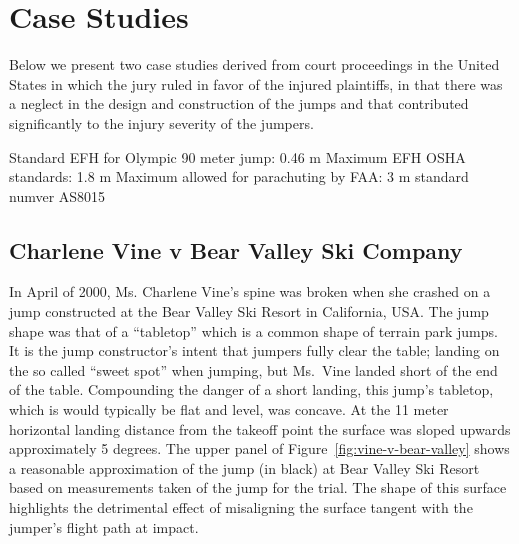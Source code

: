 \documentclass{article}
\begin{document}
\section{Case Studies}
%
Below we present two case studies derived from court proceedings in the United
States in which the jury ruled in favor of the injured plaintiffs, in that
there was a neglect in the design and construction of the jumps and that
contributed significantly to the injury severity of the jumpers.

Standard EFH for Olympic 90 meter jump: 0.46 m
Maximum EFH OSHA standards: 1.8 m
Maximum allowed for parachuting by FAA: 3 m standard numver AS8015


\subsection{Charlene Vine v Bear Valley Ski Company}
%
In April of 2000, Ms. Charlene Vine's spine was broken when she crashed on a
jump constructed at the Bear Valley Ski Resort in California, USA. The jump
shape was that of a ``tabletop'' which is a common shape of terrain park jumps.
It is the jump constructor's intent that jumpers fully clear the table; landing
on the so called ``sweet spot'' when jumping, but Ms.~Vine landed short of the
end of the table.
Compounding the danger of a short landing, this jump's tabletop, which is
would typically be flat and level, was concave.
At the 11 meter horizontal landing distance from the takeoff point the surface
was sloped upwards approximately 5 degrees.
The upper panel of Figure~\ref{fig:vine-v-bear-valley} shows a reasonable
approximation of the jump (in black) at Bear Valley Ski Resort based on
measurements taken of the jump for the trial.
The shape of this surface highlights the detrimental effect of misaligning the
surface tangent with the jumper's flight path at impact.
%
\end{document}
